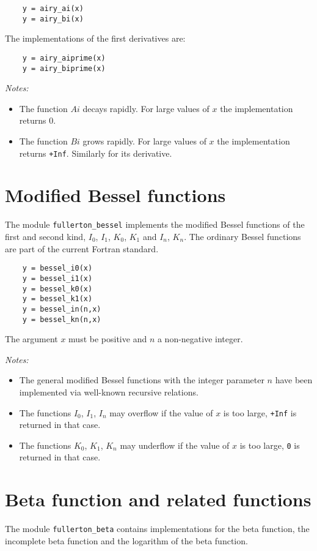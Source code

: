 \documentclass{article}
\begin{document}
\begin{verbatim}
    y = airy_ai(x)
    y = airy_bi(x)
\end{verbatim}

The implementations of the first derivatives are:

\begin{verbatim}
    y = airy_aiprime(x)
    y = airy_biprime(x)
\end{verbatim}

\emph{Notes:}
\begin{itemize}
\item
The function $Ai$ decays rapidly. For large values of $x$ the implementation returns 0.
\item
The function $Bi$ grows rapidly. For large values of $x$ the implementation returns \verb~+Inf~. Similarly for its derivative.
\end{itemize}


\section{Modified Bessel functions}
The module \verb+fullerton_bessel+ implements the modified Bessel functions of the first and second kind, $I_0$, $I_1$, $K_0$, $K_1$
and $I_n$, $K_n$. The ordinary Bessel functions are part of the current Fortran standard.

\begin{verbatim}
    y = bessel_i0(x)
    y = bessel_i1(x)
    y = bessel_k0(x)
    y = bessel_k1(x)
    y = bessel_in(n,x)
    y = bessel_kn(n,x)
\end{verbatim}
The argument $x$ must be positive and $n$ a non-negative integer.

\emph{Notes:}
\begin{itemize}
\item
The general modified Bessel functions with the integer parameter $n$ have been implemented via
well-known recursive relations.
\item
The functions $I_0$, $I_1$, $I_n$ may overflow if the value of $x$ is too large, \verb~+Inf~ is returned in that case.
\item
The functions $K_0$, $K_1$, $K_n$ may underflow if the value of $x$ is too large, \verb~0~ is returned in that case.
\end{itemize}


\section{Beta function and related functions}
The module \verb+fullerton_beta+ contains implementations for the beta function, the incomplete beta function
and the logarithm of the beta function.
\end{document}
